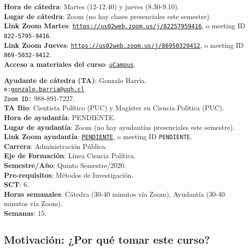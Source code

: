 \documentclass[letterpaper]{article}
\begin{document}
\vspace{5mm}
{\bf Hora de c\'atedra}: Martes (12-12.40) y jueves (8.30-9.10).\\
{\bf Lugar de c\'atedra}: Zoom (no hay clases presenciales este semestre).\\
{\bf Link Zoom Martes}: \href{https://us02web.zoom.us/j/82257959416}{\texttt{https://us02web.zoom.us/j/82257959416}}, o meeting ID {\texttt{822-5795-9416}}.\\
{\bf Link Zoom Jueves}: \href{https://us02web.zoom.us/j/86950329412}{\texttt{https://us02web.zoom.us/j/86950329412}}, o meeting ID {\texttt{869-5032-9412}}.\\
{\bf Acceso a materiales del curso}: \href{https://ucampus.uoh.cl/uoh/2020/1/APU3601/1}{\texttt{uCampus}}.

\vspace{5mm}
{\bf Ayudante de c\'atedra (TA)}: Gonzalo Barr\'ia.\\
\texttt{e:}\href{mailto:gonzalo.barria@uoh.cl}{\texttt{gonzalo.barria@uoh.cl}}\\
\texttt{Zoom ID:} 988-891-7227.\\
{\bf TA Bio}: Cientista Pol\'itico (PUC) y Mag\'ister en Ciencia Pol\'itica (PUC).\\
{\bf Hora de ayudant\'ia}: {\color{red}PENDIENTE}.\\
{\bf Lugar de ayudant\'ia}: Zoom (no hay ayudant\'ias presenciales este semestre).\\
{\bf Link Zoom ayudant\'ia}: \href{https://us02web.zoom.us/j/82257959416}{\texttt{PENDIENTE}}, o meeting ID {\texttt{PENDIENTE}}.\\


\vspace{5mm}
{\bf Carrera}:	Administraci\'on P\'ublica.\\
{\bf Eje de Formaci\'on}: L\'inea Ciencia Pol\'itica.\\
{\bf Semestre/A\~no}:	Quinto Semestre/2020.\\
{\bf Pre-requisitos}: M\'etodos de Investigaci\'on.\\
{\bf SCT}: 6.\\
{\bf Horas semanales}: C\'atedra (30-40 minutos v\'ia Zoom), Ayudant\'ia	(30-40 minutos v\'ia Zoom). \\
{\bf Semanas}:	15.\\



\subsection*{Motivaci\'on: ¿Por qu\'e tomar este curso?}
\end{document}
